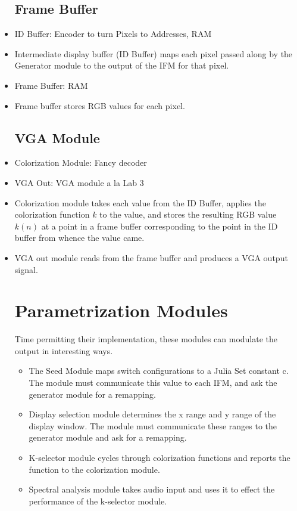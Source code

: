 \documentclass{article}
\begin{document}
\begin{itemize}
\subsection{Frame Buffer}

\item ID Buffer: Encoder to turn Pixels to Addresses, RAM
\item Intermediate display buffer (ID Buffer) maps each pixel passed
  along by the Generator module to the output of the IFM for that
  pixel.

\item Frame Buffer: RAM
\item Frame buffer stores RGB values for each pixel.

\subsection{VGA Module}

\item Colorization Module: Fancy decoder
\item VGA Out: VGA module a la Lab 3

\item Colorization module takes each value from the ID Buffer, applies
  the colorization function $k$ to the value, and stores the resulting
  RGB value $k(n)$ at a point in a frame buffer corresponding to the
  point in the ID buffer from whence the value came.

\item VGA out module reads from the frame buffer and produces a VGA
  output signal.



\section{Parametrization Modules}

Time permitting their implementation, these modules can modulate the
output in interesting ways.

\begin{itemize}
\item The Seed Module maps switch configurations to a Julia Set
  constant c. The module must communicate this value to each IFM, and
  ask the generator module for a remapping.
\item Display selection module determines the x range and y range of
  the display window.  The module must communicate these ranges to the
  generator module and ask for a remapping.
\item K-selector module cycles through colorization functions and
  reports the function to the colorization module.
\item Spectral analysis module takes audio input and uses it to effect
  the performance of the k-selector module.
\end{itemize}



\end{itemize}
\end{document}
